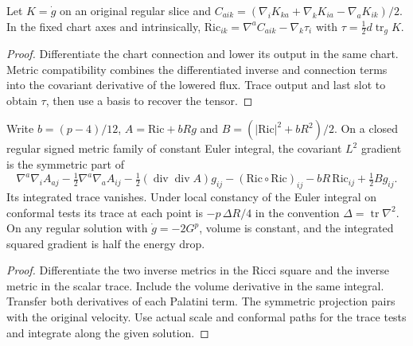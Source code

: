 \begin{proposition}
\label{prop:ed50-palatini}
\leanok
Let $K=\dot g$ on an original regular slice and
$C_{aik}=(\nabla_iK_{ka}+\nabla_kK_{ia}-\nabla_aK_{ik})/2$.
In the fixed chart axes and intrinsically,
$\dot{\mathrm{Ric}}_{ik}=\nabla^a C_{aik}-\nabla_k\tau_i$
with $\tau=\tfrac12 d\operatorname{tr}_gK$.
\end{proposition}
\begin{proof}
\leanok
Differentiate the chart connection and lower its output in the same chart.
Metric compatibility combines the differentiated inverse and connection
terms into the covariant derivative of the lowered flux. Trace output
and last slot to obtain $\tau$, then use a basis to recover the tensor.
\end{proof}

\begin{proposition}
\label{prop:ed50-gradient}
\leanok
Write $b=(p-4)/12$, $A=\mathrm{Ric}+bRg$ and
$B=(|\mathrm{Ric}|^2+bR^2)/2$.
On a closed regular signed metric family of constant Euler integral,
the covariant $L^2$ gradient is the symmetric part of
\[
 \nabla^a\nabla_i A_{aj}-\tfrac12\nabla^a\nabla_a A_{ij}
 -\tfrac12(\operatorname{div}\operatorname{div}A)g_{ij}
 -(\mathrm{Ric}\circ\mathrm{Ric})_{ij}-bR\,\mathrm{Ric}_{ij}+\tfrac12 B g_{ij}.
\]
Its integrated trace vanishes. Under local constancy of the Euler integral
on conformal tests its trace at each point is $-p\,\Delta R/4$ in the
convention $\Delta=\operatorname{tr}\nabla^2$. On any regular solution
with $\dot g=-2G^p$, volume is constant, and the integrated squared
gradient is half the energy drop.
\end{proposition}
\begin{proof}
\leanok
Differentiate the two inverse metrics in the Ricci square and the
inverse metric in the scalar trace. Include the volume derivative in
the same integral. Transfer both derivatives of each Palatini term.
The symmetric projection pairs with the original velocity. Use actual
scale and conformal paths for the trace tests and integrate along the given solution.
\end{proof}

